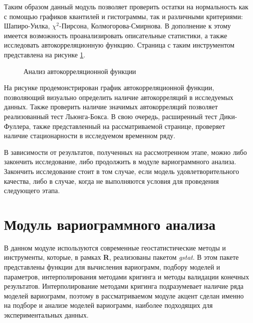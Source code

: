 Таким образом данный модуль позволяет проверить остатки на нормальность как с помощью графиков квантилей и гистограммы, так и различными критериями: Шапиро-Уилка, $ \chi^2 $-Пирсона, Колмогорова-Смирнова. В дополнение к этому имеется возможность проанализировать описательные статистики, а также исследовать автокорреляционную функцию. Страница с таким инструментом представлена на рисунке \ref{img:mod_acf}.
\begin{figure}[ht]
\caption{Анализ автокорреляционной функции}
\label{img:mod_acf}
\end{figure}
На рисунке продемонстрирован график автокорреляционной функции, позволяющий визуально определить наличие автокорреляций в исследуемых данных. Также проверить наличие значимых автокорреляций позволяет реализованный тест Льюнга-Бокса. В свою очередь, расширенный тест Дики-Фуллера, также представленный на рассматриваемой странице, проверяет наличие стационарности в исследуемом временном ряду.

В зависимости от результатов, полученных на рассмотренном этапе, можно либо закончить исследование, либо продолжить в модуле вариограммного анализа. Закончить исследование стоит в том случае, если модель удовлетворительного качества, либо в случае, когда не выполняются условия для проведения следующего этапа.


\section{Модуль вариограммного анализа} %
\label{sec:mod_variogram}

В данном модуле используются современные геостатистические методы и инструменты, которые, в рамках \textbf{R}, реализованы пакетом \textit{gstat}. В этом пакете представлены функции для вычисления вариограмм, подбору моделей и параметров, интерполирования методами кригинга и методы валидации конечных результатов. Интерполирование методами кригинга подразумевает наличие ряда моделей вариограмм, поэтому в рассматриваемом модуле акцент сделан именно на подборе и анализе моделей вариограмм, наиболее подходящих для экспериментальных данных.

